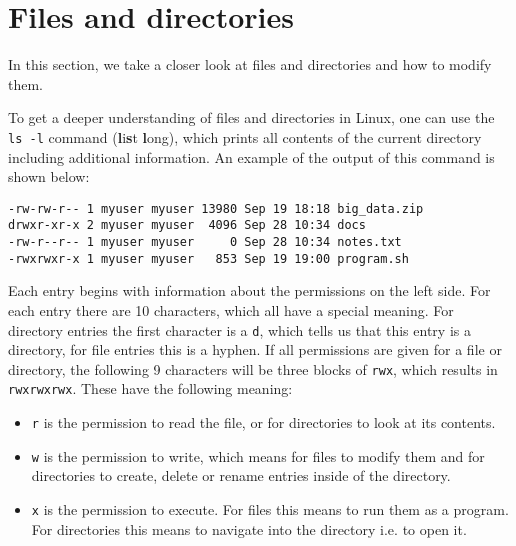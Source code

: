 \section{Files and directories}
\label{sec:file_and_dirs}

In this section, we take a closer look at files and directories and how to modify them.

To get a deeper understanding of files and directories in Linux, one can use the \lstinline{ls -l} command (\textbf{l}i\textbf{s}t \textbf{l}ong), which prints all contents of the current directory including additional information. An example of the output of this command is shown below:

\begin{lstlisting}
-rw-rw-r-- 1 myuser myuser 13980 Sep 19 18:18 big_data.zip
drwxr-xr-x 2 myuser myuser  4096 Sep 28 10:34 docs
-rw-r--r-- 1 myuser myuser     0 Sep 28 10:34 notes.txt
-rwxrwxr-x 1 myuser myuser   853 Sep 19 19:00 program.sh
\end{lstlisting}

Each entry begins with information about the permissions on the left side. For each entry there are 10 characters, which all have a special meaning. For directory entries the first character is a \lstinline{d}, which tells us that this entry is a directory, for file entries this is a hyphen. If all permissions are given for a file or directory, the following 9 characters will be three blocks of \lstinline{rwx}, which results in \lstinline{rwxrwxrwx}. These have the following meaning:

\begin{itemize}
    \item \lstinline{r} is the permission to read the file, or for directories to look at its contents.
    \item \lstinline{w} is the permission to write, which means for files to modify them and for directories to create, delete or rename entries inside of the directory.
    \item \lstinline{x} is the permission to execute. For files this means to run them as a program. For directories this means to navigate into the directory i.e. to open it.
\end{itemize}

